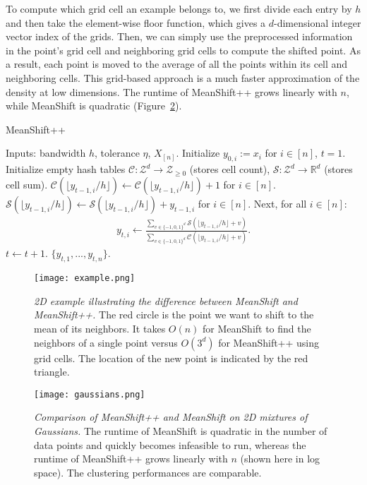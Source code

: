 To compute which grid cell an example belongs to, we first divide each entry by $h$ and then take the element-wise floor function, which gives a $d$-dimensional integer vector index of the grids. Then, we can simply use the preprocessed information in the point's grid cell and neighboring grid cells to compute the shifted point. As a result, each point is moved to the average of all the points within its cell and neighboring cells. This grid-based approach is a much faster approximation of the density at low dimensions. The runtime of MeanShift++ grows linearly with $n$, while MeanShift is quadratic (Figure~\ref{fig:gaussians}).

\begin{algorithm}[H]
\caption{MeanShift++}
\label{alg:meanshiftpp}
\begin{algorithmic}[H]
  \State Inputs: bandwidth $h$, tolerance $\eta$, $X_{[n]}$.
  \State Initialize $y_{0, i} := x_i$ for $i \in [n]$, $t = 1$.
   \Do
  \State Initialize empty hash tables $\mathcal{C}: \mathcal{Z}^d \rightarrow \mathcal{Z}_{\ge 0}$ (stores cell count), $\mathcal{S}: \mathcal{Z}^d \rightarrow \mathbb{R}^d$ (stores cell sum).
  \State $\mathcal{C}(\lfloor y_{t-1, i} / h \rfloor) \leftarrow \mathcal{C}(\lfloor y_{t-1, i} / h \rfloor) + 1$ for $i \in [n]$.
  \State $\mathcal{S}(\lfloor y_{t-1, i} / h \rfloor) \leftarrow \mathcal{S}(\lfloor y_{t-1, i} / h \rfloor) + y_{t-1, i}$ for $i \in [n]$.
  \State Next, for all $i \in [n]$: \begin{align*}
      y_{t,i} \leftarrow \frac{\sum_{v \in \{-1, 0, 1\}^d} \mathcal{S}(\lfloor y_{t-1, i} / h \rfloor + v)  }{\sum_{v \in \{-1, 0, 1\}^d} \mathcal{C}(\lfloor y_{t-1, i} / h \rfloor + v) }.
  \end{align*} 
  \State $t \leftarrow t + 1$.
   \State \Return $\{y_{t,1},...,y_{t, n}\}$.
\end{algorithmic}
\end{algorithm}


\begin{figure}
\begin{center}
\texttt{[image: example.png]}
\end{center}
   \caption{\label{fig:example}\textit{2D example illustrating the difference between MeanShift and MeanShift++.} The red circle is the point we want to shift to the mean of its neighbors. It takes $O(n)$ for MeanShift to find the neighbors of a single point versus $O(3^d)$ for MeanShift++ using grid cells. The location of the new point is indicated by the red triangle.}
\end{figure}
\begin{figure}
\begin{center}
\texttt{[image: gaussians.png]}
\end{center}
   \caption{\label{fig:gaussians}\textit{Comparison of MeanShift++ and MeanShift on 2D mixtures of Gaussians.} The runtime of MeanShift is quadratic in the number of data points and quickly becomes infeasible to run, whereas the runtime of MeanShift++ grows linearly with $n$ (shown here in log space). The clustering performances are comparable.}
\end{figure}